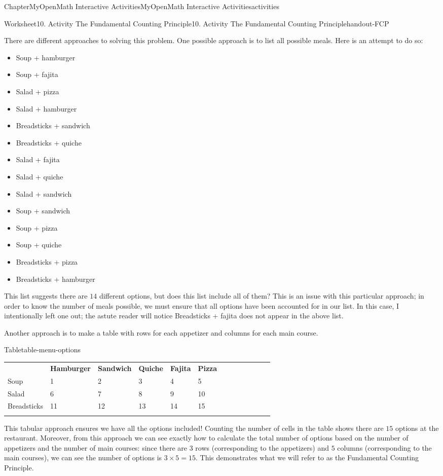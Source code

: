 \documentclass[oneside,10pt,]{book}
\newcommand{\tabularfont}{\relax}
\newcommand{\ptxlistdisc}{\raisebox{0.3ex}{\textbullet}}
\newcommand{\hrulethin}  {\noalign{\hrule height 0.04em}}
\begin{document}
\begin{chapterptx}{Chapter}{MyOpenMath Interactive Activities}{}{MyOpenMath Interactive Activities}{}{}{activities}
\begin{worksheet-section}{Worksheet}{10. Activity The Fundamental Counting Principle}{}{10. Activity The Fundamental Counting Principle}{}{}{handout-FCP}
\par
There are different approaches to solving this problem. One possible approach is to list all possible meals. Here is an attempt to do so:%
\begin{itemize}[label=\ptxlistdisc]
\item{}Soup + hamburger%
\item{}Soup + fajita%
\item{}Salad + pizza%
\item{}Salad + hamburger%
\item{}Breadsticks + sandwich%
\item{}Breadsticks + quiche%
\item{}Salad + fajita%
\item{}Salad + quiche%
\item{}Salad + sandwich%
\item{}Soup + sandwich%
\item{}Soup + pizza%
\item{}Soup + quiche%
\item{}Breadsticks + pizza%
\item{}Breadsticks + hamburger%
\end{itemize}
This list suggests there are \(14\) different options, but does this list include all of them? This is an issue with this particular approach; in order to know the number of meals possible, we must ensure that all options have been accounted for in our list. In this case, I intentionally left one out; the astute reader will notice Breadsticks + fajita does not appear in the above list.%
\par
Another approach is to make a table with rows for each appetizer and columns for each main course.%
\clearpage
\begin{tableptx}{Table}{\textbf{}}{table-menu-options}{}%
\centering%
{\tabularfont%
\begin{tabular}{AlAlAlAlAlAlA}\hrulethin
{\bfseries{}}&{\bfseries{}Hamburger}&{\bfseries{}Sandwich}&{\bfseries{}Quiche}&{\bfseries{}Fajita}&{\bfseries{}Pizza}\tabularnewline\hrulethin
Soup&1&2&3&4&5\tabularnewline\hrulethin
Salad&6&7&8&9&10\tabularnewline\hrulethin
Breadsticks&11&12&13&14&15\tabularnewline\hrulethin
\end{tabular}
}%
\end{tableptx}%
This tabular approach ensures we have all the options included! Counting the number of cells in the table shows there are \(15\) options at the restaurant. Moreover, from this approach we can see exactly how to calculate the total number of options based on the number of appetizers and the number of main courses: since there are \(3\) rows (corresponding to the appetizers) and \(5\) columns (corresponding to the main courses), we can see the number of options is \(3 \times 5 = 15\). This demonstrates what we will refer to as the Fundamental Counting Principle.%

\end{worksheet-section}
\end{chapterptx}
\end{document}

